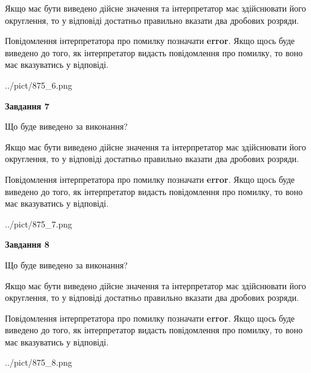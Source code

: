 \documentclass[12pt, ukrainian]{article}
\begin{document}
{\begin {Large}
Якщо має бути виведено дійсне значення та інтерпретатор має здійснювати його округлення, 
то у відповіді достатньо правильно вказати два дробових розряди.

Повідомлення інтерпретатора про помилку позначати \textbf{error}.
Якщо щось буде виведено до того, як інтерпретатор видасть повідомлення про помилку, 
то воно має вказуватись у відповіді. \par

\begin{center}
	{../pict/875_6.png}
\end{center}
\newpage

{\begin {center}\textbf{Завдання 7}\end {center}}\par
Що буде виведено за виконання? \par

Якщо має бути виведено дійсне значення та інтерпретатор має здійснювати його округлення, 
то у відповіді достатньо правильно вказати два дробових розряди.

Повідомлення інтерпретатора про помилку позначати \textbf{error}.
Якщо щось буде виведено до того, як інтерпретатор видасть повідомлення про помилку, 
то воно має вказуватись у відповіді. \par

\begin{center}
	{../pict/875_7.png}
\end{center}
\newpage

{\begin {center}\textbf{Завдання 8}\end {center}}\par
Що буде виведено за виконання? \par

Якщо має бути виведено дійсне значення та інтерпретатор має здійснювати його округлення, 
то у відповіді достатньо правильно вказати два дробових розряди.

Повідомлення інтерпретатора про помилку позначати \textbf{error}.
Якщо щось буде виведено до того, як інтерпретатор видасть повідомлення про помилку, 
то воно має вказуватись у відповіді. \par

\begin{center}
	{../pict/875_8.png}
\end{center}
\newpage


\end{Large}}
\end{document}
